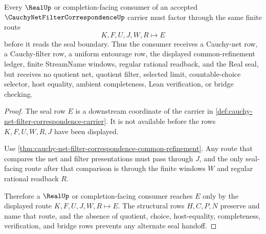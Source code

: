 \begin{theorem}
\label{thm:cauchy-net-filter-correspondence-real-seal-handoff}
Every $\RealUp$ or completion-facing consumer of an accepted $\CauchyNetFilterCorrespondenceUp$ carrier must factor through the same finite route
$$
K,F,U,J,W,R \longmapsto E
$$
before it reads the seal boundary. Thus the consumer receives a Cauchy-net row, a Cauchy-filter row, a uniform entourage row, the displayed common-refinement ledger, finite StreamName windows, regular rational readback, and the Real seal, but receives no quotient net, quotient filter, selected limit, countable-choice selector, host equality, ambient completeness, Lean verification, or bridge checking.
\end{theorem}
\begin{proof}
The seal row $E$ is a downstream coordinate of the carrier in \autoref{def:cauchy-net-filter-correspondence-carrier}. It is not available before the rows $K,F,U,W,R,J$ have been displayed.

Use \autoref{thm:cauchy-net-filter-correspondence-common-refinement}. Any route that compares the net and filter presentations must pass through $J$, and the only seal-facing route after that comparison is through the finite windows $W$ and regular rational readback $R$.

Therefore a $\RealUp$ or completion-facing consumer reaches $E$ only by the displayed route $K,F,U,J,W,R\longmapsto E$. The structural rows $H,C,P,N$ preserve and name that route, and the absence of quotient, choice, host-equality, completeness, verification, and bridge rows prevents any alternate seal handoff.
\end{proof}


